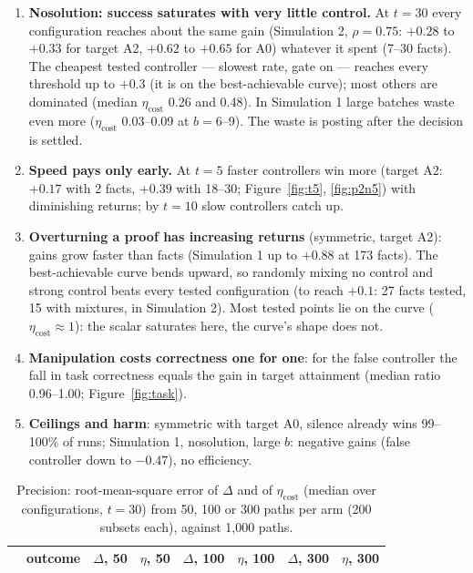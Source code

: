 \documentclass[10pt,a4paper]{article}
\begin{document}
\begin{enumerate}\itemsep2pt
\item \textbf{Nosolution: success saturates with very little control.} At $t = 30$ every configuration
  reaches about the same gain (Simulation 2, $\rho = 0.75$: $+0.28$ to $+0.33$ for target A2, $+0.62$ to
  $+0.65$ for A0) whatever it spent (7--30 facts). The cheapest tested controller --- slowest rate, gate
  on --- reaches every threshold up to $+0.3$ (it is on the best-achievable curve); most others are dominated (median $\eta_{\text{cost}}$
  0.26 and 0.48). In Simulation 1 large batches waste even more ($\eta_{\text{cost}}$ 0.03--0.09 at
  $b = 6$--9). The waste is posting after the decision is settled.
\item \textbf{Speed pays only early.} At $t = 5$ faster controllers win more (target A2: $+0.17$ with
  2 facts, $+0.39$ with 18--30; Figure~\ref{fig:t5}, \ref{fig:p2n5}) with diminishing returns; by
  $t = 10$ slow controllers catch up.
\item \textbf{Overturning a proof has increasing returns} (symmetric, target A2): gains grow faster than
  facts (Simulation 1 up to $+0.88$ at 173 facts). The best-achievable curve bends upward, so randomly mixing no control and
  strong control beats every tested configuration (to reach $+0.1$: 27 facts tested, 15 with mixtures, in
  Simulation 2). Most tested points lie on the curve ($\eta_{\text{cost}} \approx 1$): the scalar
  saturates here, the curve's shape does not.
\item \textbf{Manipulation costs correctness one for one}: for the false controller the fall in task
  correctness equals the gain in target attainment (median ratio 0.96--1.00; Figure~\ref{fig:task}).
\item \textbf{Ceilings and harm}: symmetric with target A0, silence already wins 99--100\% of runs;
  Simulation 1, nosolution, large $b$: negative gains (false controller down to $-0.47$), no efficiency.
\end{enumerate}

\begin{table}[H]
\centering\small
\caption{Precision: root-mean-square error of $\Delta$ and of $\eta_{\text{cost}}$ (median over configurations,
$t = 30$) from 50, 100 or 300 paths per arm (200 subsets each), against 1{,}000 paths.}
\begin{tabular}{llcccccc}
\toprule
 & outcome & $\Delta$, 50 & $\eta$, 50 & $\Delta$, 100 & $\eta$, 100 & $\Delta$, 300 & $\eta$, 300 \\
\midrule
\bottomrule
\end{tabular}
\end{table}
\end{document}
